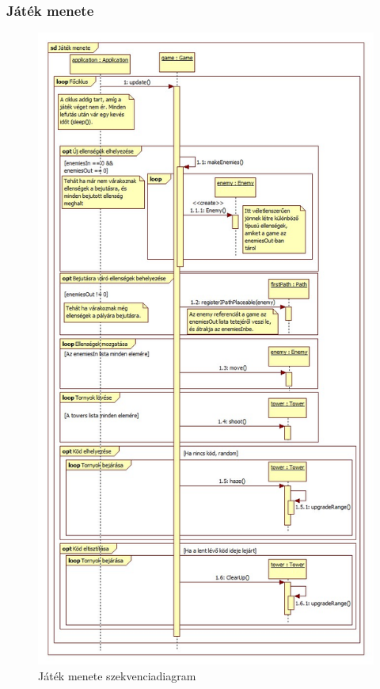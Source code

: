\subsubsection{Játék menete}
\begin{figure}[H]
\begin{center}
\includegraphics[width=13cm]{chapters/chapter07/images/sd_Jatek_menete.jpg}
\caption{Játék menete szekvenciadiagram}
\label{fig:Játék_menete2}
\end{center}
\end{figure}


